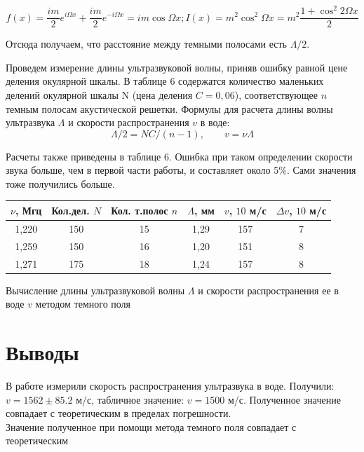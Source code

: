 \documentclass[a4paper, 12pt]{article}%
\begin{document}
	\begin{equation}\label{}
		f(x) = \dfrac{im}{2} e^{i\Omega x} +  \dfrac{im}{2} e^{-i\Omega x} = im \cos \Omega x ; I(x) = m^2 \cos ^2 \Omega x = m^2 \dfrac{1 + \cos ^2 2 \Omega x}{2}
	\end{equation}
	
	Отсюда получаем, что расстояние между темными полосами есть $ \Lambda/2 $.
	
	Проведем измерение длины ультразвуковой волны, приняв ошибку равной цене деления окулярной шкалы. В таблице 6 содержатся количество маленьких делений окулярной шкалы N (цена деления $ C = 0,06 $), соответствующее $ n $ темным полосам акустической решетки.
	Формулы для расчета длины волны ультразвука $ \Lambda $ и скорости распространения $ v $ в воде:
	\begin{equation}\label{}
		\Lambda/2  = NC/(n - 1),  \qquad v = \nu\Lambda
	\end{equation}
	
	Расчеты также приведены в таблице 6. Ошибка при таком определении скорости звука больше, чем в первой части работы, и
	составляет около 5\%. Сами значения тоже получились больше.
	\begin{center}
		\begin{tabular}{|c|c|c|c|c|c|}
			\hline
			$\nu$, Мгц & Кол.дел. $N$ & Кол. т.полос $n$ & $\Lambda$, мм & $v$, $10$ м/с & $\Delta v$, $10$ м/с\\
			\hline
			1,220&150&15&1,29&157&7\\
			\hline
			1,259&150&16&1,20&151&8\\
			\hline
			1,271&175&18&1,24&157&8\\
			\hline
		\end{tabular}
	\end{center}
		Вычисление длины ультразвуковой волны $ \Lambda $ и скорости распространения ее в воде $ v $ методом темного поля
	\section{Выводы}
	В работе измерили скорость распространения ультразвука в воде. Получили: $v = 1562 \pm 85.2$ м/с, табличное значение: $v = 1500$ м/с. Полученное значение совпадает с теоретическим в пределах погрешности.\\
	Значение полученное при помощи метода темного поля совпадает с теоретическим
\end{document}
